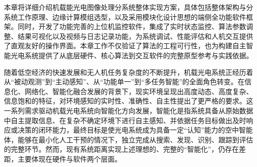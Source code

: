 
本章将详细介绍机载能光电图像处理分系统整体实现方案，具体包括整体架构与分系统工作原理、边缘计算模组选型，以及采用模块化设计思想的端侧全功能软件框架。同时，开发了功能完善的上位机监控软件，集成了实时状态监控、算法参数调整、结果可视化以及视频与日志记录功能，为系统调试、性能评估和人机交互提供了直观友好的操作界面。本章工作不仅验证了算法的工程可行性，也为构建自主智能光电系统提供了从底层硬件、核心算法到交互软件的完整原型参考与实践依据。

随着低空经济的快速发展和无人机任务复杂度的不断提升，机载光电系统正经历着从“被动观测”到“主动感知”、从“功能单一”到“多任务智能”的全面角色转变。在信息化、网络化、智能化融合发展的背景下，现实环境呈现出高度动态、高度复杂、信息饱和的特征，对环境感知的实时性、准确性、自主性提出了更严格的要求。这一系列需求驱动机载光电系统向智能化方向发展，智能化是指系统具备从原始数据中自主提取信息、在复杂不确定环境下进行自主感知、并依据任务目标做出及时响应或决策的闭环能力，最终目标是使光电系统成为具备一定“认知”能力的空中智能体，能够在最小化人工干预的情况下，独立完成从搜索、发现、识别、跟踪到评估的完整环节。然而，现有系统距离实现上述理想的、完整的“智能化”，仍存在差距，主要体现在硬件与软件两个层面。

